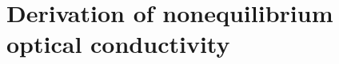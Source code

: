 \documentclass[aps,prb,reprint,noeprint,superscriptaddress]{revtex4-2}
\begin{document}

\appendix


\section{Derivation of nonequilibrium optical conductivity}
\label{sec:derivation_noneq_cond}
\end{document}
